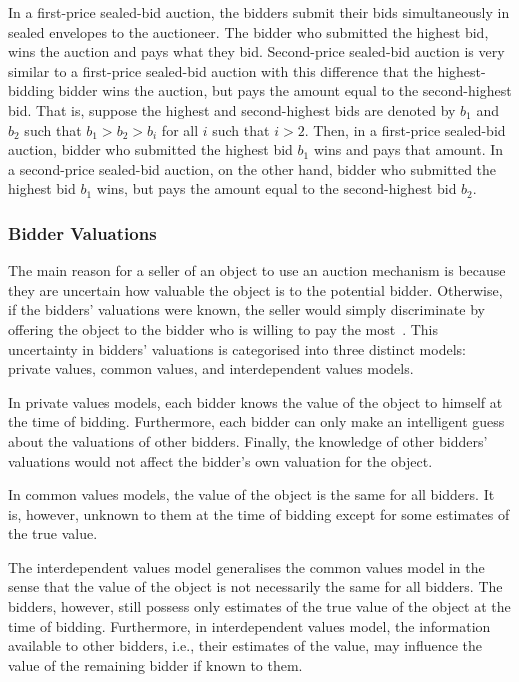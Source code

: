 In a first-price sealed-bid auction, the bidders submit their bids simultaneously in sealed envelopes to the auctioneer. The bidder who submitted the highest bid, wins the auction and pays what they bid. Second-price sealed-bid auction is very similar to a first-price sealed-bid auction with this difference that the highest-bidding bidder wins the auction, but pays the amount equal to the second-highest bid. That is, suppose the highest and second-highest bids are denoted by $b_1$ and $b_2$ such that $b_1 > b_2 > b_i$ for all $i$ such that $i > 2$. Then, in a first-price sealed-bid auction, bidder who submitted the highest bid $b_1$ wins and pays that amount. In a second-price sealed-bid auction, on the other hand, bidder who submitted the highest bid $b_1$ wins, but pays the amount equal to the second-highest bid $b_2$.

\subsubsection{Bidder Valuations} %
\label{ssub:bidder_valuations_dmp}
The main reason for a seller of an object to use an auction mechanism is because they are uncertain how valuable the object is to the potential bidder. Otherwise, if the bidders' valuations were known, the seller would simply discriminate by offering the object to the bidder who is willing to pay the most~\cite{Krishna10}. This uncertainty in bidders' valuations is categorised into three distinct models: private values, common values, and interdependent values models.

In private values models, each bidder knows the value of the object to himself at the time of bidding. Furthermore, each bidder can only make an intelligent guess about the valuations of other bidders. Finally, the knowledge of other bidders' valuations would not affect the bidder's own valuation for the object.

In common values models, the value of the object is the same for all bidders. It is, however, unknown to them at the time of bidding except for some estimates of the true value.

The interdependent values model generalises the common values model in the sense that the value of the object is not necessarily the same for all bidders. The bidders, however, still possess only estimates of the true value of the object at the time of bidding. Furthermore, in interdependent values model, the information available to other bidders, i.e., their estimates of the value, may influence the value of the remaining bidder if known to them.


